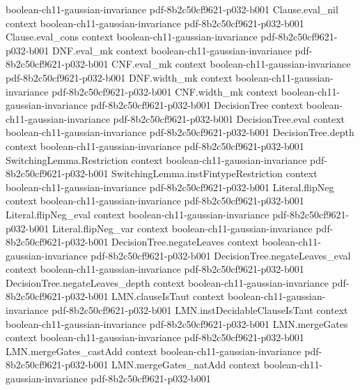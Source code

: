 \begin{theorem}
  {boolean-ch11-gaussian-invariance}
  {pdf-8b2c50cf9621-p032-b001}
\proofstep
  {Clause.eval_nil}
  {context}
  {boolean-ch11-gaussian-invariance}
  {pdf-8b2c50cf9621-p032-b001}
\proofstep
  {Clause.eval_cons}
  {context}
  {boolean-ch11-gaussian-invariance}
  {pdf-8b2c50cf9621-p032-b001}
\proofstep
  {DNF.eval_mk}
  {context}
  {boolean-ch11-gaussian-invariance}
  {pdf-8b2c50cf9621-p032-b001}
\proofstep
  {CNF.eval_mk}
  {context}
  {boolean-ch11-gaussian-invariance}
  {pdf-8b2c50cf9621-p032-b001}
\proofstep
  {DNF.width_mk}
  {context}
  {boolean-ch11-gaussian-invariance}
  {pdf-8b2c50cf9621-p032-b001}
\proofstep
  {CNF.width_mk}
  {context}
  {boolean-ch11-gaussian-invariance}
  {pdf-8b2c50cf9621-p032-b001}
\proofstep
  {DecisionTree}
  {context}
  {boolean-ch11-gaussian-invariance}
  {pdf-8b2c50cf9621-p032-b001}
\proofstep
  {DecisionTree.eval}
  {context}
  {boolean-ch11-gaussian-invariance}
  {pdf-8b2c50cf9621-p032-b001}
\proofstep
  {DecisionTree.depth}
  {context}
  {boolean-ch11-gaussian-invariance}
  {pdf-8b2c50cf9621-p032-b001}
\proofstep
  {SwitchingLemma.Restriction}
  {context}
  {boolean-ch11-gaussian-invariance}
  {pdf-8b2c50cf9621-p032-b001}
\proofstep
  {SwitchingLemma.instFintypeRestriction}
  {context}
  {boolean-ch11-gaussian-invariance}
  {pdf-8b2c50cf9621-p032-b001}
\proofstep
  {Literal.flipNeg}
  {context}
  {boolean-ch11-gaussian-invariance}
  {pdf-8b2c50cf9621-p032-b001}
\proofstep
  {Literal.flipNeg_eval}
  {context}
  {boolean-ch11-gaussian-invariance}
  {pdf-8b2c50cf9621-p032-b001}
\proofstep
  {Literal.flipNeg_var}
  {context}
  {boolean-ch11-gaussian-invariance}
  {pdf-8b2c50cf9621-p032-b001}
\proofstep
  {DecisionTree.negateLeaves}
  {context}
  {boolean-ch11-gaussian-invariance}
  {pdf-8b2c50cf9621-p032-b001}
\proofstep
  {DecisionTree.negateLeaves_eval}
  {context}
  {boolean-ch11-gaussian-invariance}
  {pdf-8b2c50cf9621-p032-b001}
\proofstep
  {DecisionTree.negateLeaves_depth}
  {context}
  {boolean-ch11-gaussian-invariance}
  {pdf-8b2c50cf9621-p032-b001}
\proofstep
  {LMN.clauseIsTaut}
  {context}
  {boolean-ch11-gaussian-invariance}
  {pdf-8b2c50cf9621-p032-b001}
\proofstep
  {LMN.instDecidableClauseIsTaut}
  {context}
  {boolean-ch11-gaussian-invariance}
  {pdf-8b2c50cf9621-p032-b001}
\proofstep
  {LMN.mergeGates}
  {context}
  {boolean-ch11-gaussian-invariance}
  {pdf-8b2c50cf9621-p032-b001}
\proofstep
  {LMN.mergeGates_castAdd}
  {context}
  {boolean-ch11-gaussian-invariance}
  {pdf-8b2c50cf9621-p032-b001}
\proofstep
  {LMN.mergeGates_natAdd}
  {context}
  {boolean-ch11-gaussian-invariance}
  {pdf-8b2c50cf9621-p032-b001}

\end{theorem}
